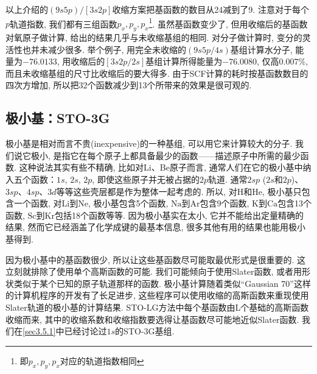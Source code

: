 以上介绍的$(9s5p)/[3s2p]$收缩方案把基函数的数目从24减到了9. 
注意对于每个$p$轨道指数, 我们都有三组函数$p_x,p_y,p_x$\footnote{
	即$p_x,p_y,p_x$对应的轨道指数相同
}. 
虽然基函数变少了, 但用收缩后的基函数对氧原子做计算, 
给出的结果几乎与未收缩基组的相同. 对分子做计算时, 变分的灵活性也并未减少很多. 
举个例子, 用完全未收缩的$(9s5p/4s)$基组计算水分子, 能量为$-76.0133$, 
用收缩后的$[3s2p/2s]$基组计算所得能量为$-76.0080$, 仅高$0.007\%$, 而且未收缩基组的尺寸比收缩后的要大得多. 
由于SCF计算的耗时按基函数数目的四次方增加, 所以把32个函数减少到13个所带来的效果是很可观的. 

\subsection{极小基：STO-3G}
极小基是相对而言不贵(inexpensive)的一种基组, 
可以用它来计算较大的分子. 
我们说它极小, 
是指它在每个原子上都具备最少的函数——描述原子中所需的最少函数. 
这种说法其实有些不精确, 
比如对Li、Be原子而言, 
通常人们在它的极小基中纳入五个函数：$1s$, $2s$, $2p$, 
即使这些原子并无被占据的$2p$轨道. 
通常$2sp$ ($2s$和$2p$)、$3sp$、$4sp$、$3d$等等这些壳层都是作为整体一起考虑的. 
所以, 
对$\mathrm{H}$和$\mathrm{He}$, 
极小基只包含一个函数, 
对$\mathrm{Li}$到$\mathrm{Ne}$, 
极小基包含5个函数, 
$\mathrm{Na}$到$\mathrm{Ar}$包含9个函数, 
$\mathrm{K}$到$\mathrm{Ca}$包含13个函数,
$\mathrm{Sc}$到$\mathrm{Kr}$包括18个函数等等. 
因为极小基实在太小, 
它并不能给出定量精确的结果, 
然而它已经涵盖了化学成键的最基本信息, 
很多其他有用的结果也能用极小基得到. 


因为极小基中的基函数很少, 
所以让这些基函数尽可能取最优形式是很重要的. 
这立刻就排除了使用单个高斯函数的可能. 
我们可能倾向于使用Slater函数, 
或者用形状类似于某个已知的原子轨道那样的函数. 
极小基计算随着类似“Gaussian 70”这样的计算机程序的开发有了长足进步, 
这些程序可以使用收缩的高斯函数来重现使用Slater轨道的极小基的计算结果. 
STO-LG方法中每个基函数由L个基础的高斯函数收缩而来, 
其中的收缩系数和收缩指数要选得让基函数尽可能地近似Slater函数. 
我们在\autoref{sec3.5.1}中已经讨论过$1s$的STO-3G基组. 


